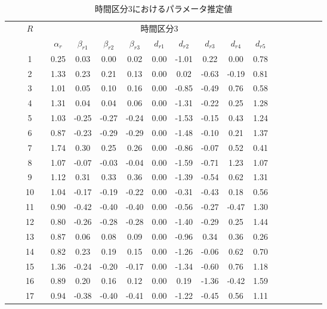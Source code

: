 \documentclass[a4paper，11pt，oneside，openany]{jsbook}
\newcommand{\bhline}[1]{\noalign{\hrule height #1}}
\begin{document}
\begin{table}[h!]
\begin{center}
\caption{時間区分3におけるパラメータ推定値}
\setlength{\tabcolsep}{5.pt}
\begin{tabular}{ccccccccccccccccccc}  
\bhline{1pt}
& & \multirow{2}{*}{$R$} & & \multicolumn{9}{c}{時間区分3}    \\
\cline{5-13}
  & &  & & $\alpha_r$ & $\beta_{r1}$ & $\beta_{r2}$ & $\beta_{r3}$ & $d_{r1}$ &  $d_{r2}$ & $d_{r3}$ & $d_{r4}$ & $d_{r5}$  \\
\bhline{1pt}
 &  & 1  &  & 0.25 & 0.03  & 0.00  & 0.02  & 0.00 & -1.01 & 0.22  & 0.00  & 0.78 \\
 &  & 2  &  & 1.33 & 0.23  & 0.21  & 0.13 & 0.00 & 0.02  & -0.63 & -0.19 & 0.81 \\
 &  & 3  &  & 1.01 & 0.05  & 0.10  & 0.16  & 0.00 & -0.85 & -0.49 & 0.76  & 0.58 \\
 &  & 4  &  & 1.31 & 0.04  & 0.04  & 0.06  & 0.00 & -1.31 & -0.22 & 0.25  & 1.28 \\
 &  & 5  &  & 1.03 & -0.25 & -0.27 & -0.24 & 0.00 & -1.53 & -0.15 & 0.43  & 1.24 \\
 &  & 6  &  & 0.87 & -0.23 & -0.29 & -0.29 & 0.00 & -1.48 & -0.10 & 0.21  & 1.37 \\
 &  & 7  &  & 1.74 & 0.30  & 0.25  & 0.26  & 0.00 & -0.86 & -0.07 & 0.52  & 0.41 \\
 &  & 8  &  & 1.07 & -0.07 & -0.03 & -0.04 & 0.00 & -1.59 & -0.71 & 1.23  & 1.07 \\
 &  & 9  &  & 1.12 & 0.31  & 0.33  & 0.36  & 0.00 & -1.39 & -0.54 & 0.62  & 1.31 \\
 &  & 10 &  & 1.04 & -0.17 & -0.19 & -0.22 & 0.00 & -0.31 & -0.43 & 0.18  & 0.56 \\
 &  & 11 &  & 0.90 & -0.42 & -0.40 & -0.40 & 0.00 & -0.56 & -0.27 & -0.47 & 1.30 \\
 &  & 12 &  & 0.80 & -0.26 & -0.28 & -0.28 & 0.00 & -1.40 & -0.29 & 0.25  & 1.44 \\
 &  & 13 &  & 0.87 & 0.06  & 0.08  & 0.09  & 0.00 & -0.96 & 0.34  & 0.36  & 0.26 \\
 &  & 14 &  & 0.82 & 0.23  & 0.19  & 0.15  & 0.00 & -1.26 & -0.06 & 0.62  & 0.70 \\
 &  & 15 &  & 1.36 & -0.24 & -0.20 & -0.17 & 0.00 & -1.34 & -0.60 & 0.76  & 1.18 \\
 &  & 16 &  & 0.89 & 0.20  & 0.16  & 0.12  & 0.00 & 0.19  & -1.36 & -0.42 & 1.59 \\
 &  & 17 &  & 0.94 & -0.38 & -0.40 & -0.41 & 0.00 & -1.22 & -0.45 & 0.56  & 1.11 \\

\end{tabular}
\end{center}
\end{table}
\end{document}
